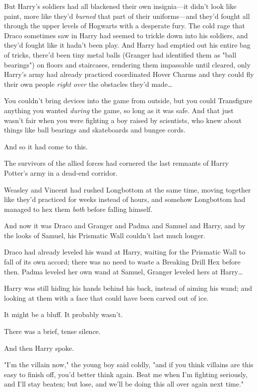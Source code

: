 But Harry's soldiers had all blackened their own insignia---it didn't look like
paint, more like they'd \emph{burned} that part of their uniforms---and they'd
fought all through the upper levels of Hogwarts with a desperate fury. The cold
rage that Draco sometimes saw in Harry had seemed to trickle down into his
soldiers, and they'd fought like it hadn't been play. And Harry had emptied out
his entire bag of tricks, there'd been tiny metal balls (Granger had identified
them as "ball bearings") on floors and staircases, rendering them impassable
until cleared, only Harry's army had already practiced coordinated Hover Charms
and they could fly their own people \emph{right over} the obstacles they'd
made{\ldots}

You couldn't bring devices into the game from outside, but you could
Transfigure anything you wanted \emph{during} the game, so long as it was safe.
And that just wasn't fair when you were fighting a boy raised by scientists,
who knew about things like ball bearings and skateboards and bungee cords.

And so it had come to this.

The survivors of the allied forces had cornered the last remnants of Harry
Potter's army in a dead-end corridor.

Weasley and Vincent had rushed Longbottom at the same time, moving together
like they'd practiced for weeks instead of hours, and somehow Longbottom had
managed to hex them \emph{both} before falling himself.

And now it was Draco and Granger and Padma and Samuel and Harry, and by the
looks of Samuel, his Prismatic Wall couldn't last much longer.

Draco had already leveled his wand at Harry, waiting for the Prismatic Wall to
fall of its own accord; there was no need to waste a Breaking Drill Hex before
then. Padma leveled her own wand at Samuel, Granger leveled hers at
Harry{\ldots}

Harry was still hiding his hands behind his back, instead of aiming his wand;
and looking at them with a face that could have been carved out of ice.

It might be a bluff. It probably wasn't.

There was a brief, tense silence.

And then Harry spoke.

"I'm the villain now," the young boy said coldly, "and if you think villains
are this easy to finish off, you'd better think again. Beat me when I'm
fighting seriously, and I'll stay beaten; but lose, and we'll be doing this all
over again next time."

